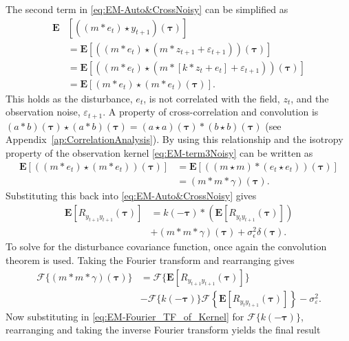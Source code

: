 \documentclass[10pt,twocolumn,twoside]{IEEEtran}
\begin{document}
The second term in \eqref{eq:EM-Auto&CrossNoisy} can be simplified as
\begin{align}\label{eq:EM-term3Noisy}
\mathbf{E}&[((m\ast e_t)\star y_{t+1})(\boldsymbol\tau)]\nonumber \\
&=\mathbf{E}[((m\ast e_t)\star (m\ast z_{t+1}+\varepsilon_{t+1})) (\boldsymbol\tau)] \nonumber \\
	&= \mathbf{E}[(\left(m \ast e_t\right) \star (m \ast [k\ast z_t + e_t]+\varepsilon_{t+1}))(\boldsymbol\tau)] \nonumber \\
	&=\mathbf{E}[\left(m \ast e_t\right)\star\left(m \ast e_t\right)(\boldsymbol\tau)].
\end{align}  
This holds as the disturbance, $e_t$, is not correlated with the field, $z_t$, and the observation noise, $\varepsilon_{t+1}$. A property of cross-correlation and convolution is $(a \ast b)(\boldsymbol\tau) \star (a \ast b)(\boldsymbol\tau)=(a \star a)(\boldsymbol\tau)\ast(b \star b)(\boldsymbol\tau)$ (see Appendix~\ref{ap:CorrelationAnalysis}). By using this relationship and the isotropy property of the observation kernel \eqref{eq:EM-term3Noisy} can be written as
\begin{align}\label{eq:EM-Autoterm4}
\mathbf{E}[(\left(m \ast e_t\right)\star\left(m \ast e_t\right))(\boldsymbol\tau)]&=\mathbf{E}[(\left(m \star m\right)\ast\left(e_t \star e_t\right))(\boldsymbol\tau)] \nonumber \\
&=(m\ast m \ast \gamma)(\boldsymbol\tau).
\end{align}
Substituting this back into \eqref{eq:EM-Auto&CrossNoisy} gives
\begin{align}
	\mathbf{E}[R_{y_{t+1}y_{t+1}}(\boldsymbol{\tau})] &=k(-\boldsymbol\tau) \ast (\mathbf{E}\left[R_{y_ty_{t+1}}(\boldsymbol\tau)\right] ) \nonumber \\
	&+(m\ast m \ast \gamma)(\boldsymbol\tau) +\sigma_{\epsilon}^2\delta(\boldsymbol{\tau}).
\end{align}
To solve for the disturbance covariance function, once again the convolution theorem is used. Taking the Fourier transform and rearranging gives
\begin{align}
	\mathcal{F}\{(m\ast m \ast \gamma)(\boldsymbol\tau)\} &= \mathcal{F}\{\mathbf{E}[R_{y_{t+1}y_{t+1}}(\boldsymbol{\tau})]\}\nonumber \\ 
	&-\mathcal{F}\{k(-\boldsymbol\tau)\}\mathcal{F}\left\{\mathbf{E}\left[R_{y_ty_{t+1}}(\boldsymbol\tau)\right] \right\}-\sigma_{\varepsilon}^2.
\end{align}
Now substituting in \eqref{eq:EM-Fourier_TF_of_Kernel} for $\mathcal{F}\{k(-\boldsymbol{\tau})\}$, rearranging and taking the inverse Fourier transform yields the final result 
\end{document}
